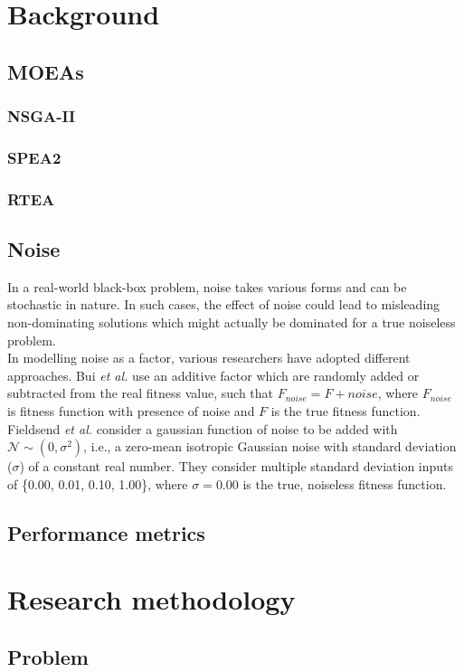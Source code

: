 \documentclass[conference]{IEEEtran}
\begin{document}
\section{Background}
\subsection{MOEAs}
\subsubsection{NSGA-II}
\subsubsection{SPEA2}
\subsubsection{RTEA}
\subsection{Noise}
In a real-world black-box problem, noise takes various forms and can be stochastic in nature. In such cases, the effect of noise could lead to misleading non-dominating solutions which might actually be dominated for a true noiseless problem. \\
In modelling noise as a factor, various researchers have adopted different approaches. Bui \textit{et al.} \cite{bui2005} use an additive factor which are randomly added or subtracted from the real fitness value, such that $F_{noise} = F + noise$, where $F_{noise}$ is fitness function with presence of noise and $F$ is the true fitness function. Fieldsend \textit{et al.} \cite{fieldsend2015} consider a gaussian function of noise to be added with $\mathcal{N} \sim (0, \sigma^{2})$, i.e., a zero-mean isotropic Gaussian noise with standard deviation ($\sigma$) of a constant real number. They consider multiple standard deviation inputs of \{0.00, 0.01, 0.10, 1.00\}, where $\sigma = 0.00$ is the true, noiseless fitness function.
\subsection{Performance metrics}


\section{Research methodology}
\subsection{Problem}
\end{document}
